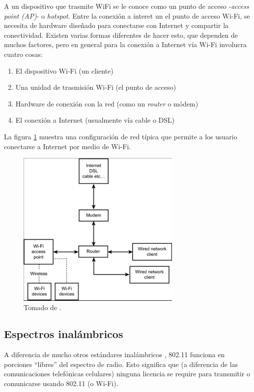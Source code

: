 \documentclass[10pt,journal,compsoc]{IEEEtran}
\begin{document}
A un dispositivo que trasmite WiFi se le conoce como un punto de acceso -\emph{access point (AP)}- o \emph{hotspot}. Entre la conexión a interet un el punto de acceso Wi-Fi, se necesita de hardware diseñado para conectarse con Internet y compartir la conectividad. Existen varias formas diferentes de hacer esto, que dependen de muchos factores, pero en general para la conexión a Internet vía Wi-Fi involucra cuatro cosas:
\begin{enumerate}
    \item El dispositivo Wi-Fi (un cliente)
    \item Una unidad de trasmisión Wi-Fi (el punto de acceso)
    \item Hardware de conexión con la red (como un \emph{router} o módem)
    \item El conexión a Internet (usualmente vía cable o DSL)
\end{enumerate}

La figura \ref{fig:wifi-red-basica} muestra una configuración de red típica que permite a los usuario conectarse a Internet por medio de Wi-Fi.

\begin{figure}[h]
    \centering
    \includegraphics[width=8cm]{wifi-red-basica}
    \caption{Tomado de \cite{davis}.}
    \label{fig:wifi-red-basica}
\end{figure}


\subsection{Espectros inalámbricos}
A diferencia de mucho otros estándares inalámbricos , 802.11 funciona en porciones ``libres'' del espectro de radio. Esto significa que (a diferencia de las comunicaciones telefónicas celulares) ninguna licencia se require para transmitir o comunicarse usando 802.11 (o Wi-Fi).
\end{document}
